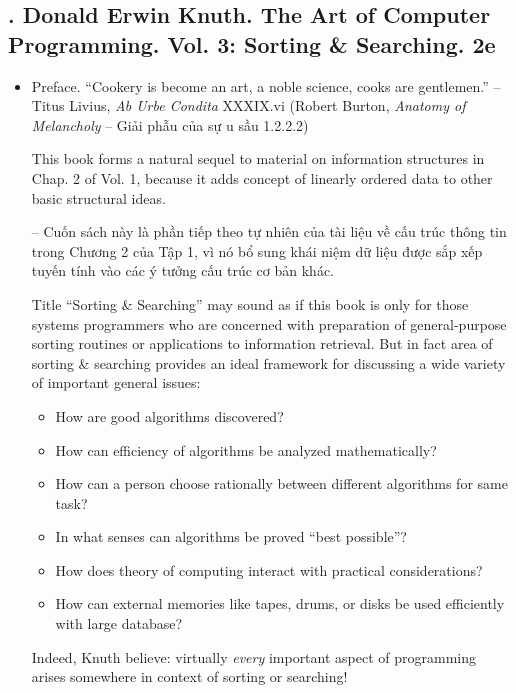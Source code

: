 \documentclass{article}
\begin{document}

\subsection{\cite{Knuth1998}. {\sc Donald Erwin Knuth}. The Art of Computer Programming. Vol. 3: Sorting \& Searching. 2e}

\begin{itemize}
    \item {\sf Preface.} ``Cookery is become an art, a noble science, cooks are gentlemen.'' -- {\sc Titus Livius}, {\it Ab Urbe Condita} XXXIX.vi (Robert Burton, {\it Anatomy of Melancholy} -- Giải phẫu của sự u sầu 1.2.2.2)
    
    This book forms a natural sequel to material on information structures in Chap. 2 of Vol. 1, because it adds concept of linearly ordered data to other basic structural ideas.
    
    -- Cuốn sách này là phần tiếp theo tự nhiên của tài liệu về cấu trúc thông tin trong Chương 2 của Tập 1, vì nó bổ sung khái niệm dữ liệu được sắp xếp tuyến tính vào các ý tưởng cấu trúc cơ bản khác.
    
    Title ``Sorting \& Searching'' may sound as if this book is only for those systems programmers who are concerned with preparation of general-purpose sorting routines or applications to information retrieval. But in fact area of sorting \& searching provides an ideal framework for discussing a wide variety of important general issues:
    \begin{itemize}
        \item How are good algorithms discovered?
        \item How can efficiency of algorithms be analyzed mathematically?
        \item How can a person choose rationally between different algorithms for same task?
        \item In what senses can algorithms be proved ``best possible''?
        \item How does theory of computing interact with practical considerations?
        \item How can external memories like tapes, drums, or disks be used efficiently with large database?
    \end{itemize}
    Indeed, {\sc Knuth} believe: virtually {\it every} important aspect of programming arises somewhere in context of sorting or searching!
    

\end{itemize}
\end{document}
